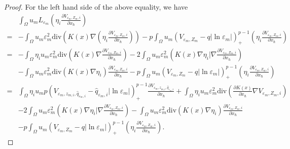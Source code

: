 \documentclass[10pt,a4paper]{amsart}
\begin{document}
\begin{proof}
For the left hand side of the above equality, we have
\begin{equation*}
\begin{split}
&\int_{\Omega}u_mL_{\varepsilon_m}\left( \eta_i\frac{\partial V_{\varepsilon_m, Z_{m},i}}{\partial x_\hbar}\right) \\
=&-\int_{\Omega}u_m\varepsilon_m^2\text{div}\left (K(x)\nabla \left( \eta_i\frac{\partial V_{\varepsilon_m, Z_{m},i}}{\partial x_\hbar}\right) \right )- p\int_{\Omega}u_m\left (V_{\varepsilon_m, Z_m}-q|\ln\varepsilon_m|\right )^{p-1}_+\left( \eta_i\frac{\partial V_{\varepsilon_m, Z_{m},i}}{\partial x_\hbar}\right)  \\
=&-\int_{\Omega}\eta_iu_m\varepsilon_m^2\text{div}\left (K(x)\nabla \frac{\partial V_{\varepsilon_m, Z_{m},i}}{\partial x_\hbar} \right )-2\int_{\Omega}u_m\varepsilon_m^2\left (K(x)\nabla\eta_i|\nabla   \frac{\partial V_{\varepsilon_m, Z_{m},i}}{\partial x_\hbar}  \right )\\
&-\int_{\Omega}u_m\varepsilon_m^2\text{div}\left (K(x)\nabla   \eta_i  \right )\frac{\partial V_{\varepsilon_m, Z_{m},i}}{\partial x_\hbar}- p\int_{\Omega}u_m\left (V_{\varepsilon_m, Z_m}-q|\ln\varepsilon_m|\right )^{p-1}_+\left( \eta_i\frac{\partial V_{\varepsilon_m, Z_{m},i}}{\partial x_\hbar}\right)
\end{split}
\end{equation*}
\begin{equation}\label{301}
\begin{split}
=&\int_{\Omega}\eta_iu_mp\left( V_{\varepsilon_m, z_{m,i}, \hat{q}_{\varepsilon_m,i}}-\hat{q}_{\varepsilon_m,i}|\ln\varepsilon_m|\right)^{p-1}_+\frac{\partial V_{\varepsilon_m, z_{m,i}, \hat{q}_{\varepsilon_m,i}}}{\partial x_\hbar}+\int_{\Omega}\eta_iu_m\varepsilon_m^2\text{div}\left (\frac{\partial K(x)}{\partial x_\hbar}\nabla V_{\varepsilon_m, Z_{m},i}  \right )\\
&-2\int_{\Omega}u_m\varepsilon_m^2\left (K(x)\nabla\eta_i|\nabla   \frac{\partial V_{\varepsilon_m, Z_{m},i}}{\partial x_\hbar}  \right ) -\int_{\Omega}u_m\varepsilon_m^2\text{div}\left (K(x)\nabla   \eta_i  \right )\frac{\partial V_{\varepsilon_m, Z_{m},i}}{\partial x_\hbar}\\
&- p\int_{\Omega}u_m\left (V_{\varepsilon_m, Z_m}-q|\ln\varepsilon_m|\right )^{p-1}_+\left( \eta_i\frac{\partial V_{\varepsilon_m, Z_{m},i}}{\partial x_\hbar}\right).
\end{split}
\end{equation}


\end{proof}
\end{document}
